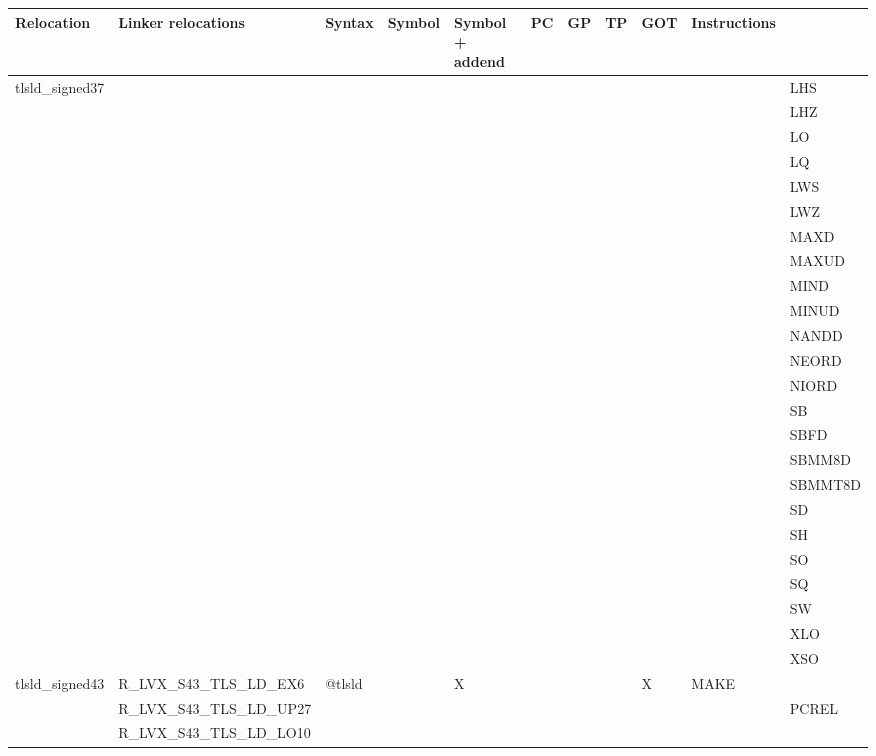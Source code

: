{\tiny
\begin{tabular}{|l|l|l|l|l|l|l|l|l|l|l|} \hline
\textsf{Relocation} & \textsf{Linker relocations} & \textsf{Syntax} & \textsf{Symbol} & \textsf{Symbol + addend} & \textsf{PC} & \textsf{GP} & \textsf{TP} & \textsf{GOT} & \textsf{Instructions} \\
\hline
\textsf{tlsld\_signed37} & & & & & & & & & & \textsf{LHS} \\
 & & & & & & & & & & \textsf{LHZ} \\
 & & & & & & & & & & \textsf{LO} \\
 & & & & & & & & & & \textsf{LQ} \\
 & & & & & & & & & & \textsf{LWS} \\
 & & & & & & & & & & \textsf{LWZ} \\
 & & & & & & & & & & \textsf{MAXD} \\
 & & & & & & & & & & \textsf{MAXUD} \\
 & & & & & & & & & & \textsf{MIND} \\
 & & & & & & & & & & \textsf{MINUD} \\
 & & & & & & & & & & \textsf{NANDD} \\
 & & & & & & & & & & \textsf{NEORD} \\
 & & & & & & & & & & \textsf{NIORD} \\
 & & & & & & & & & & \textsf{SB} \\
 & & & & & & & & & & \textsf{SBFD} \\
 & & & & & & & & & & \textsf{SBMM8D} \\
 & & & & & & & & & & \textsf{SBMMT8D} \\
 & & & & & & & & & & \textsf{SD} \\
 & & & & & & & & & & \textsf{SH} \\
 & & & & & & & & & & \textsf{SO} \\
 & & & & & & & & & & \textsf{SQ} \\
 & & & & & & & & & & \textsf{SW} \\
 & & & & & & & & & & \textsf{XLO} \\
 & & & & & & & & & & \textsf{XSO} \\
\hline
\textsf{tlsld\_signed43} & \textsf{R\_LVX\_S43\_TLS\_LD\_EX6} & \textsf{@tlsld} & \textsf{} & \textsf{X} & \textsf{} & \textsf{} & \textsf{} & \textsf{X} & \textsf{MAKE} \\
 & \textsf{R\_LVX\_S43\_TLS\_LD\_UP27} & & & & & & & & & \textsf{PCREL} \\
 & \textsf{R\_LVX\_S43\_TLS\_LD\_LO10} & & & & & & & & & \\

\end{tabular}}
